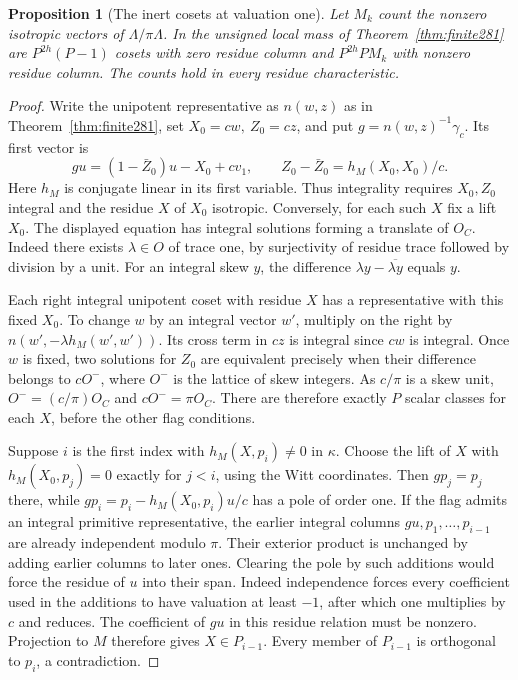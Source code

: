 \documentclass[a4paper,11pt]{article}
\newtheorem{proposition}{Proposition}[section]
\theoremstyle{definition}
\theoremstyle{remark}
\numberwithin{equation}{section}
\begin{document}
\begin{proposition}[The inert cosets at valuation one]\leavevmode
\label{prop:inertflag289}
Let \(M_k\) count the nonzero isotropic vectors of
\(\Lambda/\pi\Lambda\). In the unsigned local mass of
Theorem~\ref{thm:finite281} are \(P^{2h}(P-1)\)
cosets with zero residue column and \(P^{2h}P M_k\)
with nonzero residue column. The counts hold in every
residue characteristic.
\end{proposition}
\begin{proof}
Write the unipotent representative as \(n(w,z)\) as in
Theorem~\ref{thm:finite281}, set \(X_0=cw,\ Z_0=cz\), and
put \(g=n(w,z)^{-1}\gamma_c\). Its first vector is
\[
       gu=(1-\bar Z_0)u-X_0+cv_1,\qquad
       Z_0-\bar Z_0=h_M(X_0,X_0)/c .
\]
Here \(h_M\) is conjugate linear in its first variable.
Thus integrality requires \(X_0,Z_0\) integral and the
residue \(X\) of \(X_0\) isotropic. Conversely, for each such
\(X\) fix a lift \(X_0\). The displayed equation has
integral solutions forming a translate of \(O_C\). Indeed
there exists \(\lambda\in O\) of trace one, by surjectivity
of residue trace followed by division by a unit. For an
integral skew \(y\), the difference
\(\lambda y-\overline{\lambda y}\) equals \(y\).

Each right integral unipotent coset with residue \(X\) has a
representative with this fixed \(X_0\). To change \(w\) by an
integral vector \(w'\), multiply on the right by
\(n(w',-\lambda h_M(w',w'))\). Its cross term in \(cz\) is
integral since \(cw\) is integral. Once \(w\) is fixed,
two solutions for \(Z_0\) are equivalent precisely when their
difference belongs to \(cO^-\), where \(O^-\) is the lattice
of skew integers. As \(c/\pi\) is a skew unit,
\(O^-=(c/\pi)O_C\) and \(cO^-=\pi O_C\). There are therefore
exactly \(P\) scalar classes for each \(X\), before the other
flag conditions.

Suppose \(i\) is the first index with
\(h_M(X,p_i)\ne0\) in \(\kappa\). Choose the lift of \(X\)
with \(h_M(X_0,p_j)=0\) exactly for \(j<i\), using the Witt
coordinates. Then \(gp_j=p_j\) there, while
\(gp_i=p_i-h_M(X_0,p_i)u/c\) has a pole of order one.
If the flag admits an integral primitive representative, the
earlier integral columns \(gu,p_1,\ldots,p_{i-1}\) are already
independent modulo \(\pi\). Their exterior product is unchanged
by adding earlier columns to later ones. Clearing the pole by
such additions would force the residue of \(u\) into their
span. Indeed independence forces every coefficient used in
the additions to have valuation at least \(-1\), after which
one multiplies by \(c\) and reduces. The coefficient of \(gu\)
in this residue relation must be nonzero. Projection to \(M\)
therefore gives \(X\in P_{i-1}\). Every member of \(P_{i-1}\)
is orthogonal to \(p_i\), a contradiction.


\end{proof}
\end{document}
